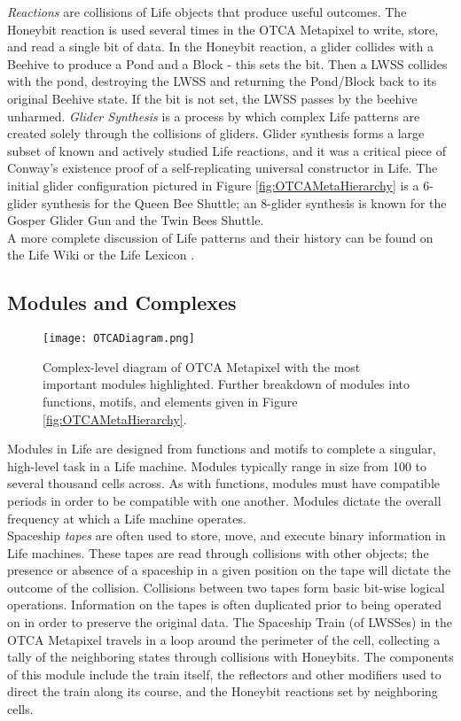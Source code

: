 {\textit{Reactions} are collisions of Life objects that produce useful outcomes.  The Honeybit reaction is used several times in the OTCA Metapixel to write, store, and read a single bit of data.  In the Honeybit reaction, a glider collides with a Beehive to produce a Pond and a Block - this sets the bit.  Then a LWSS collides with the pond, destroying the LWSS and returning the Pond/Block back to its original Beehive state.  If the bit is not set, the LWSS passes by the beehive unharmed.  \textit{Glider Synthesis} is a process by which complex Life patterns are created solely through the collisions of gliders.  Glider synthesis forms a large subset of known and actively studied Life reactions, and it was a critical piece of Conway's existence proof of a self-replicating universal constructor in Life.  The initial glider configuration pictured in Figure \ref{fig:OTCAMetaHierarchy} is a 6-glider synthesis for the Queen Bee Shuttle; an 8-glider synthesis is known for the Gosper Glider Gun and the Twin Bees Shuttle.\\

A more complete discussion of Life patterns and their history can be found on the Life Wiki \cite{Authors2016} or the Life Lexicon \cite{Silver2016}.

\subsection{Modules and Complexes}

\begin{figure}
  \texttt{[image: OTCADiagram.png]}
  \caption{Complex-level diagram of OTCA Metapixel with the most important modules highlighted.  Further breakdown of modules into functions, motifs, and elements given in Figure \ref{fig:OTCAMetaHierarchy}.}
  \label{fig:OTCADiagram}
\end{figure}

Modules in Life are designed from functions and motifs to complete a singular, high-level task in a Life machine.  Modules typically range in size from 100 to several thousand cells across.  As with functions, modules must have compatible periods in order to be compatible with one another.  Modules dictate the overall frequency at which a Life machine operates.\\

Spaceship \textit{tapes} are often used to store, move, and execute binary information in Life machines.  These tapes are read through collisions with other objects; the presence or absence of a spaceship in a given position on the tape will dictate the outcome of the collision.  Collisions between two tapes form basic bit-wise logical operations.  Information on the tapes is often duplicated prior to being operated on in order to preserve the original data.  The Spaceship Train (of LWSSes) in the OTCA Metapixel travels in a loop around the perimeter of the cell, collecting a tally of the neighboring states through collisions with Honeybits.  The components of this module include the train itself, the reflectors and other modifiers used to direct the train along its course, and the Honeybit reactions set by neighboring cells.\\

}
